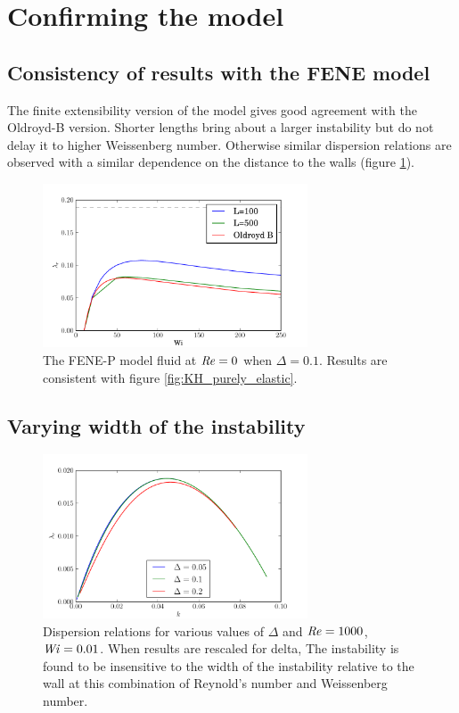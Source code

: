 \documentclass{jfm}
\newcommand\Wi{\mbox{\textit{Wi}}}
\newcommand\Rey{\mbox{\textit{Re}}}  %
\begin{document}
\section{Confirming the model}

\subsection{Consistency of results with the FENE model}

The finite extensibility version of the model gives good agreement with the
Oldroyd-B version. Shorter lengths bring about a larger instability but do not
delay it to higher Weissenberg number. Otherwise similar dispersion relations
are observed with a similar dependence on the distance to the walls (figure
\ref{fig:FENE_low_Re}).

\begin{figure} 
    \centering
    \includegraphics[width=0.7\textwidth]{FENE_purely_elastic} 
    \caption{ 
	The FENE-P model fluid at $\Rey = 0$  when $\Delta = 0.1$. Results are
	consistent with figure \ref{fig:KH_purely_elastic}.  
    }
	\label{fig:FENE_low_Re} \end{figure}

\subsection{Varying width of the instability}

\begin{figure} \centering
    \includegraphics[width=0.7\textwidth]{high_Re_vary_delta} 
    \caption{
	Dispersion relations for various values of $\Delta$ and $\Rey = 1000$,
	$\Wi = 0.01$. When results are rescaled for delta, The instability is
	found to be insensitive to the width of the instability relative to the
	wall at this combination of Reynold's number and Weissenberg number.  
    }
    \label{fig:delta_dispersion}
\end{figure}
\end{document}
